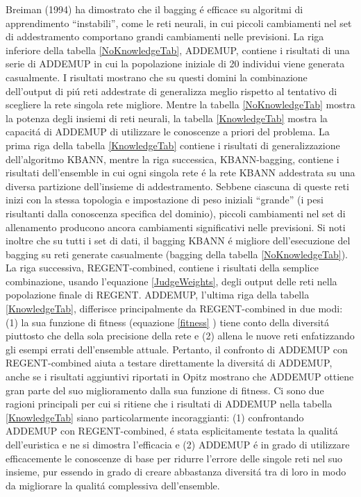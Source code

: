 \documentclass[a4paper,12pt]{report}
\begin{document}
  Breiman (1994) \cite{breiman1994bagging} ha dimostrato che il bagging \'e efficace su algoritmi di apprendimento ``instabili'', come le reti neurali, in cui piccoli cambiamenti nel set di addestramento comportano grandi cambiamenti nelle previsioni. La riga inferiore della tabella \ref{NoKnowledgeTab}, ADDEMUP, contiene i risultati di una serie di ADDEMUP in cui la popolazione iniziale di 20 individui viene generata casualmente. 
  I risultati mostrano che su questi domini la combinazione dell'output di pi\'u reti addestrate di generalizza meglio rispetto al tentativo di scegliere la rete singola rete migliore. 
  Mentre la tabella \ref{NoKnowledgeTab} mostra la potenza degli insiemi di reti neurali, la tabella \ref{KnowledgeTab} mostra la capacit\'a di ADDEMUP di utilizzare le conoscenze a priori del problema. 
  La prima riga della tabella \ref{KnowledgeTab} contiene i risultati di generalizzazione dell'algoritmo KBANN, mentre la riga successica, KBANN-bagging, contiene i risultati dell'ensemble in cui ogni singola rete \'e la rete KBANN addestrata su una diversa partizione dell'insieme di addestramento. 
  Sebbene ciascuna di queste reti inizi con la stessa topologia e impostazione di peso iniziali ``grande'' (i pesi risultanti dalla conoscenza specifica del dominio), piccoli cambiamenti nel set di allenamento producono ancora cambiamenti significativi nelle previsioni. 
  Si noti inoltre che su tutti i set di dati, il bagging KBANN \'e migliore dell'esecuzione del bagging su reti generate casualmente (bagging della tabella \ref{NoKnowledgeTab}). 
  La riga successiva, REGENT-combined, contiene i risultati della semplice combinazione, usando l'equazione \ref{JudgeWeights}, degli output delle reti nella popolazione finale di REGENT. 
  ADDEMUP, l'ultima riga della tabella \ref{KnowledgeTab}, differisce principalmente da REGENT-combined in due modi: (1) la sua funzione di fitness (equazione \ref{fitness} ) tiene conto della diversit\'a piuttosto che della sola precisione della rete e (2) allena le nuove reti enfatizzando gli esempi errati dell'ensemble attuale. 
  Pertanto, il confronto di ADDEMUP con REGENT-combined aiuta a testare direttamente la diversit\'a di ADDEMUP, anche se i risultati aggiuntivi riportati in Opitz \cite{opitz1995anytime} mostrano che ADDEMUP ottiene gran parte del suo miglioramento dalla sua funzione di fitness. 
  Ci sono due ragioni principali per cui si ritiene che i risultati di ADDEMUP nella tabella \ref{KnowledgeTab} siano particolarmente incoraggianti: (1) confrontando ADDEMUP con REGENT-combined, \'e stata esplicitamente testata la qualit\'a dell'euristica e ne si dimostra l'efficacia e (2) ADDEMUP \'e in grado di utilizzare efficacemente le conoscenze di base per ridurre l'errore delle singole reti nel suo insieme, pur essendo in grado di creare abbastanza diversit\'a tra di loro in modo da migliorare la qualit\'a complessiva dell'ensemble. 
  
\end{document}
